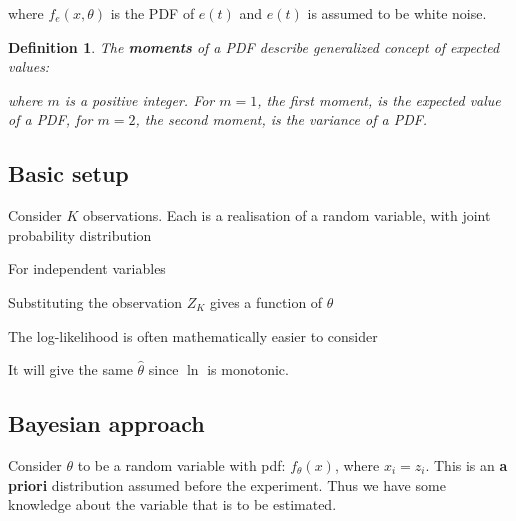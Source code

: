 \documentclass[10pt,a4paper]{scrartcl}
\newtheorem{define}{Definition}
\begin{document}
\begin{multicols*}{2}
where $f_e(x,\theta)$ is the PDF of $e(t)$ and $e(t)$ is assumed to be white noise.

\begin{define}
The \textbf{moments} of a PDF describe generalized concept of expected values:


where $m$ is a positive integer. For $m=1$, the first moment, is the expected value of a PDF, for $m=2$, the second moment, is the variance of a PDF.
\end{define}

\subsection{Basic setup}



Consider $K$ observations. Each is a realisation of a random variable, with joint probability distribution


For independent variables


Substituting the observation $Z_K$ gives a function of $\theta$



The log-likelihood is often mathematically easier to consider


It will give the same $\hat{\theta}$ since $\ln$ is monotonic.

\subsection{Bayesian approach}

Consider $\theta$ to be a random variable with pdf: $f_\theta(x)$, where $x_i = z_i$. This is an \textbf{a priori} distribution assumed before the experiment. Thus we have some knowledge about the variable that is to be estimated.


\end{multicols*}
\end{document}
